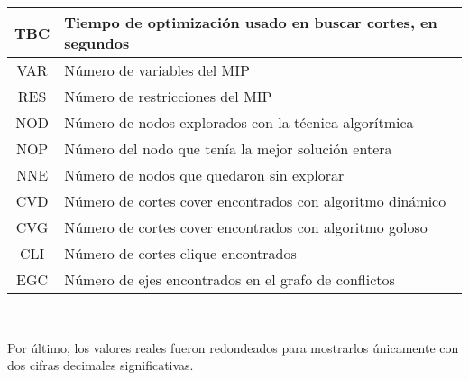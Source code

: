 {\begin{tabular}{c p{10cm}}
\hline
TBC & Tiempo de optimización usado en buscar cortes, en segundos\\
\hline
VAR & Número de variables del MIP\\
\hline
RES & Número de restricciones del MIP\\
\hline
NOD & Número de nodos explorados con la técnica algorítmica\\
\hline
NOP & Número del nodo que tenía la mejor solución entera\\
\hline
NNE & Número de nodos que quedaron sin explorar\\
\hline
CVD & Número de cortes cover encontrados con algoritmo dinámico\\
\hline
CVG & Número de cortes cover encontrados con algoritmo goloso\\
\hline
CLI & Número de cortes clique encontrados\\
\hline
EGC & Número de ejes encontrados en el grafo de conflictos\\
\hline
\end{tabular}\\}
\vspace{1cm}

\noindent Por último, los valores reales fueron redondeados para mostrarlos únicamente con dos cifras decimales significativas.
